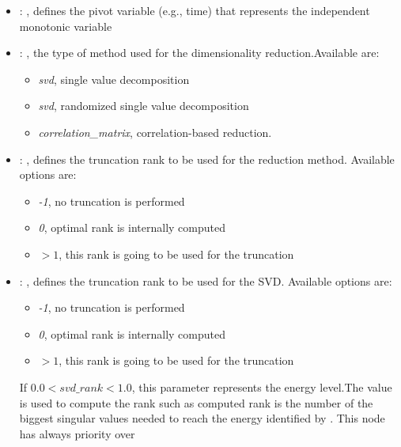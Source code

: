 \begin{itemize}
    \item {}: , 
      defines the pivot variable (e.g., time) that represents the
      independent monotonic variable

    \item {}: , 
      the type of method used for the dimensionality reduction.Available are:
      \begin{itemize}                                                     \item \textit{svd}, single
      value decomposition                                                     \item \textit{svd},
      randomized single value decomposition
      \item \textit{correlation\_matrix}, correlation-based reduction.
      \end{itemize}

    \item {}: , 
      defines the truncation rank to be used for the reduction method.
      Available options are:                                                  \begin{itemize}
      \item \textit{-1}, no truncation is performed
      \item \textit{0}, optimal rank is internally computed
      \item \textit{$>1$}, this rank is going to be used for the truncation
      \end{itemize}

    \item {}: , 
      defines the truncation rank to be used for the SVD.
      Available options are:                                                  \begin{itemize}
      \item \textit{-1}, no truncation is performed
      \item \textit{0}, optimal rank is internally computed
      \item \textit{$>1$}, this rank is going to be used for the truncation
      \end{itemize}                                                  If $0.0 < svd\_rank < 1.0$, this
      parameter represents the energy level.The value is used to compute the rank such
      as computed rank is the number of the biggest singular values needed to reach the energy
      identified by                                                    . This
      node has always priority over  


\end{itemize}
